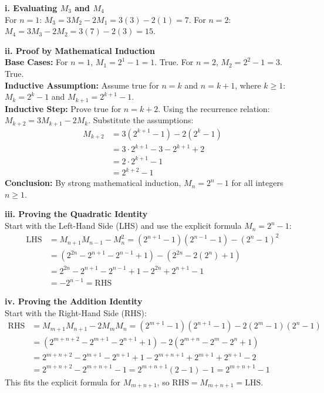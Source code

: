 \begin{solution}
\textbf{i. Evaluating $M_3$ and $M_4$}\\
For $n=1$: $M_3 = 3M_2 - 2M_1 = 3(3) - 2(1) = 7$. For $n=2$: $M_4 = 3M_3 - 2M_2 = 3(7) - 2(3) = 15$.

\textbf{ii. Proof by Mathematical Induction}\\
\textbf{Base Cases:} For $n=1$, $M_1 = 2^1 - 1 = 1$. True. For $n=2$, $M_2 = 2^2 - 1 = 3$. True.\\
\textbf{Inductive Assumption:} Assume true for $n=k$ and $n=k+1$, where $k \ge 1$: $M_k = 2^k - 1$ and $M_{k+1} = 2^{k+1} - 1$.\\
\textbf{Inductive Step:} Prove true for $n=k+2$. Using the recurrence relation: $M_{k+2} = 3M_{k+1} - 2M_k$. Substitute the assumptions:
\begin{align*}
M_{k+2} &= 3(2^{k+1} - 1) - 2(2^k - 1) \\
&= 3 \cdot 2^{k+1} - 3 - 2^{k+1} + 2 \\
&= 2 \cdot 2^{k+1} - 1 \\
&= 2^{k+2} - 1
\end{align*}
\textbf{Conclusion:} By strong mathematical induction, $M_n = 2^n - 1$ for all integers $n \ge 1$.

\textbf{iii. Proving the Quadratic Identity}\\
Start with the Left-Hand Side (LHS) and use the explicit formula $M_n = 2^n - 1$:
\begin{align*}
\text{LHS} &= M_{n+1}M_{n-1} - M_n^2 = (2^{n+1}-1)(2^{n-1}-1) - (2^n-1)^2\\
&= (2^{2n} - 2^{n+1} - 2^{n-1} + 1) - (2^{2n} - 2(2^n) + 1)\\
&= 2^{2n} - 2^{n+1} - 2^{n-1} + 1 - 2^{2n} + 2^{n+1} - 1\\
&= -2^{n-1} = \text{RHS}
\end{align*}

\textbf{iv. Proving the Addition Identity}\\
Start with the Right-Hand Side (RHS):
\begin{align*}
\text{RHS} &= M_{m+1}M_{n+1} - 2M_m M_n = (2^{m+1}-1)(2^{n+1}-1) - 2(2^m-1)(2^n-1)\\
&= (2^{m+n+2} - 2^{m+1} - 2^{n+1} + 1) - 2(2^{m+n} - 2^m - 2^n + 1)\\
&= 2^{m+n+2} - 2^{m+1} - 2^{n+1} + 1 - 2^{m+n+1} + 2^{m+1} + 2^{n+1} - 2\\
&= 2^{m+n+2} - 2^{m+n+1} - 1 = 2^{m+n+1}(2 - 1) - 1 = 2^{m+n+1} - 1
\end{align*}
This fits the explicit formula for $M_{m+n+1}$, so $\text{RHS} = M_{m+n+1} = \text{LHS}$.
\end{solution}

